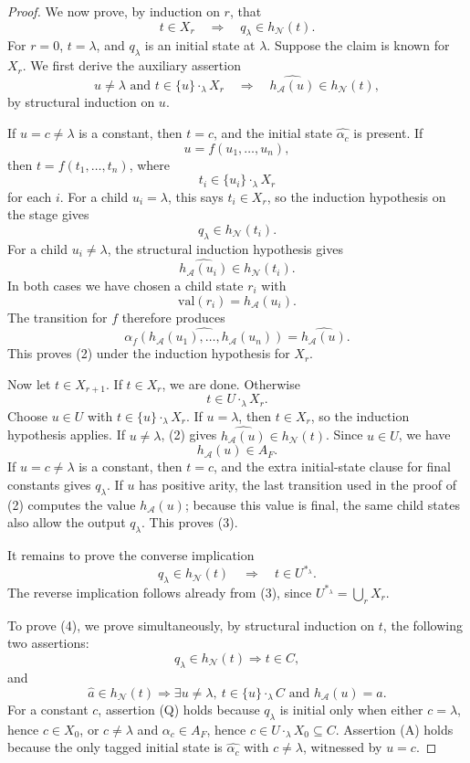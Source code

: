 \documentclass[11pt]{article}
\theoremstyle{definition}
\newcommand{\Aut}{\mathcal A}
\begin{document}
\begin{proof}
We now prove, by induction on \(r\), that
\[
  t\in X_r \quad\Longrightarrow\quad q_\lambda\in h_{\mathcal N}(t).      \tag{3}
\]
For \(r=0\), \(t=\lambda\), and \(q_\lambda\) is an initial state at
\(\lambda\).  Suppose the claim is known for \(X_r\).  We first derive the
auxiliary assertion
\[
  u\ne\lambda\text{ and }t\in\{u\}\cdot_\lambda X_r
  \quad\Longrightarrow\quad
  \widehat{h_\Aut(u)}\in h_{\mathcal N}(t),        \tag{2}
\]
by structural induction on \(u\).

If \(u=c\ne\lambda\) is a constant, then \(t=c\), and the initial state
\(\widehat{\alpha_c}\) is present.  If
\[
  u=f(u_1,\ldots,u_n),
\]
then \(t=f(t_1,\ldots,t_n)\), where
\[
  t_i\in\{u_i\}\cdot_\lambda X_r
\]
for each \(i\).  For a child \(u_i=\lambda\), this says \(t_i\in X_r\), so the
induction hypothesis on the stage gives
\[
  q_\lambda\in h_{\mathcal N}(t_i).
\]
For a child \(u_i\ne\lambda\), the structural induction hypothesis gives
\[
  \widehat{h_\Aut(u_i)}\in h_{\mathcal N}(t_i).
\]
In both cases we have chosen a child state \(r_i\) with
\[
  \mathrm{val}(r_i)=h_\Aut(u_i).
\]
The transition for \(f\) therefore produces
\[
  \widehat{\alpha_f(h_\Aut(u_1),\ldots,h_\Aut(u_n))}
  =
  \widehat{h_\Aut(u)}.
\]
This proves (2) under the induction hypothesis for \(X_r\).

Now let \(t\in X_{r+1}\).
If \(t\in X_r\), we are done.  Otherwise
\[
  t\in U\cdot_\lambda X_r.
\]
Choose \(u\in U\) with \(t\in\{u\}\cdot_\lambda X_r\).  If \(u=\lambda\), then
\(t\in X_r\), so the induction hypothesis applies.  If \(u\ne\lambda\), (2)
gives \(\widehat{h_\Aut(u)}\in h_{\mathcal N}(t)\).  Since \(u\in U\), we have
\[
  h_\Aut(u)\in A_F.
\]
If \(u=c\ne\lambda\) is a constant, then \(t=c\), and the extra initial-state
clause for final constants gives \(q_\lambda\).  If \(u\) has positive arity,
the last transition used in the proof of (2) computes the value \(h_\Aut(u)\);
because this value is final, the same child states also allow the output
\(q_\lambda\).  This proves (3).

It remains to prove the converse implication
\[
  q_\lambda\in h_{\mathcal N}(t)
  \quad\Longrightarrow\quad
  t\in U^{*_\lambda}.                         \tag{4}
\]
The reverse implication follows already from (3), since
\(U^{*_\lambda}=\bigcup_r X_r\).

To prove (4), we prove simultaneously, by structural
induction on \(t\), the following two assertions:
\[
  q_\lambda\in h_{\mathcal N}(t)\Rightarrow t\in C,             \tag{Q}
\]
and
\[
  \widehat a\in h_{\mathcal N}(t)
  \Rightarrow
  \exists u\ne\lambda,\ t\in\{u\}\cdot_\lambda C
    \text{ and } h_\Aut(u)=a.                                  \tag{A}
\]
For a constant \(c\), assertion (Q) holds because \(q_\lambda\) is initial only
when either \(c=\lambda\), hence \(c\in X_0\), or \(c\ne\lambda\) and
\(\alpha_c\in A_F\), hence \(c\in U\cdot_\lambda X_0\subseteq C\).  Assertion
(A) holds because the only tagged initial state is \(\widehat{\alpha_c}\) with
\(c\ne\lambda\), witnessed by \(u=c\).


\end{proof}
\end{document}
